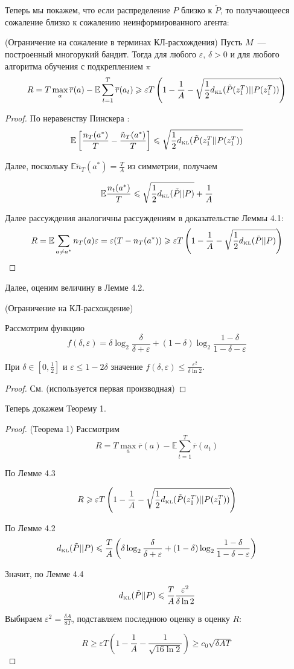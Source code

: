 \documentclass[a4paper]{article}
\newcommand{\E}{\mathbb{E}}
\newcommand{\dkl}{d_{\mbox{\tiny KL}}}
\newcommand{\ltwo}{\log_2 }
\def\eps{\varepsilon}
\begin{document}
Теперь мы покажем, что если распределение $P$ близко к $\tilde{P}$, то получающееся сожаление близко к сожалению неинформированного агента:

\begin{lemma}{(Ограничение на сожаление в терминах КЛ-расхождения)}
Пусть $M$~--- построенный многорукий бандит. Тогда для любого $\eps,\,\delta>0$ и для любого алгоритма обучения с подкреплением $\pi$
$$
R=T\max\limits_a\overline{r}(a)-\E\sum\limits_{t=1}^T\overline{r}(a_t)\geqslant \eps T \left(1-\frac{1}{A}-\sqrt{\frac{1}{2}\dkl(\tilde{P}(z_1^T)||P(z_1^T))}\right)
$$
\end{lemma}

\begin{proof}
По неравенству Пинскера \cite{bubeck}:
$$
\E\left[\frac{n_T(a^*)}{T}-\frac{\tilde{n}_T(a^*)}{T}\right]\leqslant\sqrt{\frac{1}{2}\dkl(\tilde{P}(z_1^T||P(z_1^T))}
$$

Далее, поскольку $\E \tilde{n}_T(a^*)=\frac{T}{A}$ из симметрии, получаем

$$\E\frac{n_t(a^*)}{T}\leqslant\sqrt{\frac{1}{2}\dkl(\tilde{P}||P)}+\frac{1}{A}$$

Далее рассуждения аналогичны рассуждениям в доказательстве Леммы 4.1:
$$R=\E\sum\limits_{a\neq a^*}n_T(a)\eps=\eps(T-n_T(a^*))\geqslant \eps T\left(1-\frac{1}{A}-\sqrt{\frac{1}{2}\dkl(\tilde{P}||P)}\right)$$
\end{proof}

Далее, оценим величину в Лемме 4.2.

\begin{lemma}{(Ограничение на КЛ-расхождение)}

Рассмотрим функцию $$f(\delta,\eps)=\delta\ltwo\frac{\delta}{\delta+\eps}+(1-\delta)\ltwo\frac{1-\delta}{1-\delta-\eps}$$

При $\delta\in[0,\frac{1}{2}]$ и $\eps\leqslant 1-2\delta$ значение $f(\delta,\eps)\leqslant\frac{\eps^2}{\delta\ln 2}$.
\end{lemma}

\begin{proof}
См. \cite{jaksch} (используется первая производная)
\end{proof}

Теперь докажем Теорему 1.

\begin{proof}{(Теорема 1)}
Рассмотрим
$$R=T\max\limits_a \overline{r}(a)-\E\sum\limits_{t=1}^T\overline{r}(a_t)$$

По Лемме 4.3

$$
R\geqslant\eps T \left(1-\frac{1}{A}-\sqrt{\frac{1}{2}\dkl(\tilde{P}(z_1^T)||P(z_1^T))}\right)
$$

По Лемме 4.2
$$
\dkl(\tilde{P}||P)\leqslant\frac{T}{A}\left(\delta\ltwo\frac{\delta}{\delta+\eps}+(1-\delta)\ltwo\frac{1-\delta}{1-\delta-\eps}\right)
$$

Значит, по Лемме 4.4
$$
\dkl(\tilde{P}||P)\leqslant \frac{T}{A}\frac{\eps^2}{\delta\ln 2}
$$

Выбираем $\eps^2=\frac{\delta A}{8T}$, подставляем последнюю оценку в оценку $R$:

$$
R\geqslant \eps T(1-\frac{1}{A}-\frac{1}{\sqrt{16\ln 2}})\geqslant c_0\sqrt{\delta AT}
$$
\end{proof}
\end{document}
